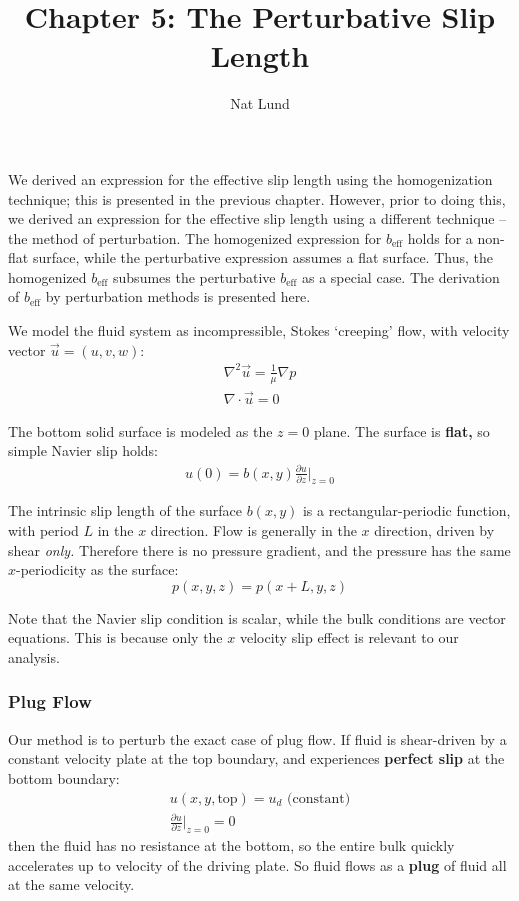 \documentclass[a4paper]{report}
\title{Chapter 5: The Perturbative Slip Length}
\author{Nat Lund}
\newcommand{\beff}{\ensuremath{b_{\mathrm{eff}}}}
\begin{document}
\maketitle

We derived an expression for the effective slip length using the homogenization technique; this is presented in the previous chapter.  However, prior to doing this, we derived an expression for the effective slip length using a different technique -- the method of perturbation.  The homogenized expression for $\beff$ holds for a non-flat surface, while the perturbative expression assumes a flat surface.  Thus, the homogenized $\beff$ subsumes the perturbative $\beff$ as a special case.  The derivation of $\beff$ by perturbation methods is presented here.

\vspace{1em}

We model the fluid system as incompressible, Stokes `creeping' flow, with velocity vector $\vec{u} = (u,v,w)$: 
\begin{gather}
\nabla^2 \vec{u} = \frac{1}{\mu} \nabla p  \\
\nabla \cdot \vec{u} = 0
\end{gather}

The bottom solid surface is modeled as the $z=0$ plane.  
The surface is \textbf{flat,} so simple Navier slip holds:
\begin{gather}
u(0) = b(x,y) \frac{\partial u}{\partial z} \rvert_{z=0}
\end{gather}

The intrinsic slip length of the surface $b(x,y)$ is a rectangular-periodic function, with period $L$ in the $x$ direction.
Flow is generally in the $x$ direction, driven by shear \emph{only.}  Therefore there is no pressure gradient, and the pressure has the same $x$-periodicity as the surface:
\begin{equation}
p(x,y,z) = p(x+L,y,z)
\end{equation}


Note that the Navier slip condition is scalar, while the bulk conditions are vector equations.  This is because only the $x$ velocity slip effect is relevant to our analysis.



\subsubsection*{Plug Flow}

Our method is to perturb the exact case of plug flow.  If fluid is shear-driven by a constant velocity plate at the top boundary, and experiences \textbf{perfect slip} at the bottom boundary:
\begin{gather}
u(x,y,\mathrm{top}) = u_d \text{  (constant)} \\
\frac{\partial u}{\partial z} \rvert_{z=0} = 0
\end{gather}
then the fluid has no resistance at the bottom, so the entire bulk quickly accelerates up to velocity of the driving plate.  So fluid flows as a \textbf{plug} of fluid all at the same velocity.
\end{document}
